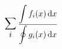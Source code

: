 \documentclass[nofonts]{ctexart}
\newcommand\D{\displaystyle}
\begin{document}
\[
	\mathop{\text{\Large$\D\sum_i$}}
	\dfrac{\D\int f_i(x)\,\mathrm{d}x}
	{\D\oint g_i(x)\,\mathrm{d}x}
\]
\end{document}
